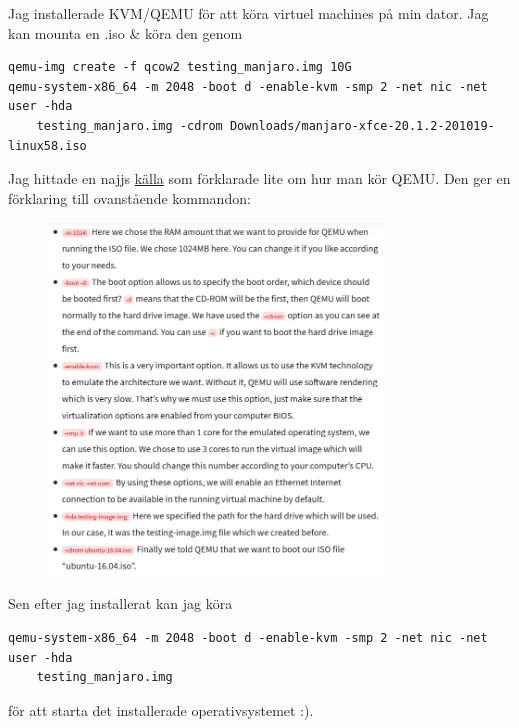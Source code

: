 Jag installerade KVM/QEMU för att köra virtuel machines på min dator. Jag kan mounta en .iso \& köra den genom
\begin{verbatim}
qemu-img create -f qcow2 testing_manjaro.img 10G
qemu-system-x86_64 -m 2048 -boot d -enable-kvm -smp 2 -net nic -net user -hda
    testing_manjaro.img -cdrom Downloads/manjaro-xfce-20.1.2-201019-linux58.iso
\end{verbatim}
Jag hittade en najjs \href{https://fosspost.org/use-qemu-test-operating-systems-distributions/}{\color{blue}källa} som förklarade lite om hur man kör QEMU. Den ger en förklaring till ovanstående kommandon:
\begin{figure}[H]
	\centering
	\includegraphics[width=0.8\textwidth]{pics/qemu_explained_example.png}
\end{figure}
Sen efter jag installerat kan jag köra
\begin{verbatim}
qemu-system-x86_64 -m 2048 -boot d -enable-kvm -smp 2 -net nic -net user -hda
    testing_manjaro.img
\end{verbatim}
för att starta det installerade operativsystemet :).


